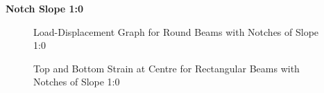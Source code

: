 \documentclass[11pt,a4paper]{article}
\numberwithin{equation}{subsection}
\begin{document}
\vspace*{\baselineskip}

\noindent
\textbf{Notch Slope 1:0}\par
\noindent
\begin{figure}[h]
	\begin{center}
	\end{center}
	\caption{Load-Displacement Graph for Round Beams with Notches of Slope 1:0}
	\label{fig:Round_10_def}
\end{figure}

\begin{figure}[h]
	\begin{center}
	\end{center}
	\caption{Top and Bottom Strain at Centre for Rectangular Beams with Notches of Slope 1:0}
	\label{fig:Round_10_Centre}
\end{figure}
\end{document}
